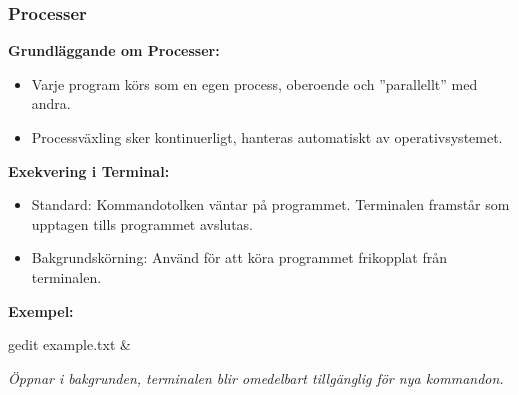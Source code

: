 



\begin{frame}[fragile=singleslide]
    \frametitle{Processer}

    \textbf{Grundläggande om Processer:}
    \begin{itemize}
        \item Varje program körs som en egen process, oberoende och ''parallellt'' med andra.
        \item Processväxling sker kontinuerligt, hanteras automatiskt av operativsystemet.
    \end{itemize}

    \textbf{Exekvering i Terminal:}
    \begin{itemize}
        \item Standard: Kommandotolken väntar på programmet. Terminalen framstår som upptagen tills programmet avslutas.
        \item Bakgrundskörning: Använd \code{\&} för att köra programmet frikopplat från terminalen.
    \end{itemize}

    \textbf{Exempel:}
    \begin{Code}
        gedit example.txt &
    \end{Code}
    \textit{Öppnar  i bakgrunden, terminalen blir omedelbart tillgänglig för nya kommandon.}

\end{frame}



